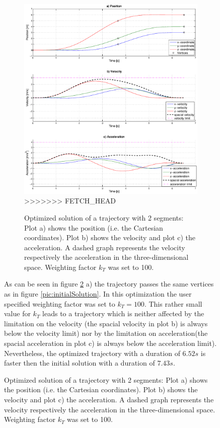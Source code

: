\begin{figure}[h]
\begin{figure}[h]
   \centering
   \includegraphics[trim = 33mm 20mm 30mm 33mm,width=1\textwidth]{pics/2SegOpti6s52k100.eps}
>>>>>>> FETCH_HEAD
   \caption{Optimized solution of a trajectory with 2 segments: Plot a) shows the position (i.e. the Cartesian coordinates). Plot b) shows the velocity and plot c) the acceleration. A dashed graph represents the velocity respectively the acceleration in the three-dimensional space. Weighting factor $k_T$ was set to 100.}
   \label{pic:optimizedSolution}
\end{figure}



As can be seen in figure \ref{pic:optimizedSolution} a) the trajectory passes the same vertices as in figure \ref{pic:initialSolution}. 
In this optimization the user specified weighting factor was set to $k_T = 100$. This rather small value for $k_T$ leads to a trajectory which is neither affected by the limitation on the velocity (the spacial velocity in plot b) is always below the velocity limit) nor by the limitation on acceleration(the spacial acceleration in plot c) is always below the acceleration limit). Nevertheless, the optimized trajectory with a duration of $6.52 s$ is faster then the initial solution with a duration of $7.43 s$.\newline


\end{figure}
